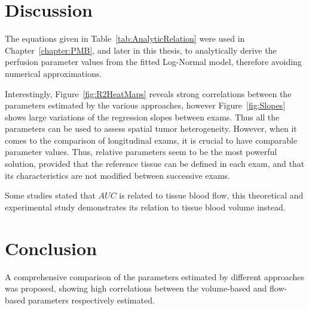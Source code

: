 \section{Discussion}
The equations given in Table~\ref{tab:AnalyticRelation} were used in Chapter~\ref{chapter:PMB}, and later in this thesis, to analytically derive the perfusion parameter values from the fitted Log-Normal model, therefore avoiding numerical approximations.

Interestingly, Figure~\ref{fig:R2HeatMaps} reveals strong correlations between the parameters estimated by the various approaches, however Figure~\ref{fig:Slopes} shows large variations of the regression slopes between exams. Thus all the parameters can be used to assess spatial tumor heterogeneity. However, when it comes to the comparison of longitudinal exams, it is crucial to have comparable parameter values. Thus, relative parameters seem to be the most powerful solution, provided that the reference tissue can be defined in each exam, and that its characteristics are not modified between successive exams.

Some studies stated that $AUC$ is related to tissue blood flow, this theoretical and experimental study demonstrates its relation to tissue blood volume instead.

\section{Conclusion}
A comprehensive comparison of the parameters estimated by different approaches was proposed, showing high correlations between the volume-based and flow-based parameters respectively estimated.